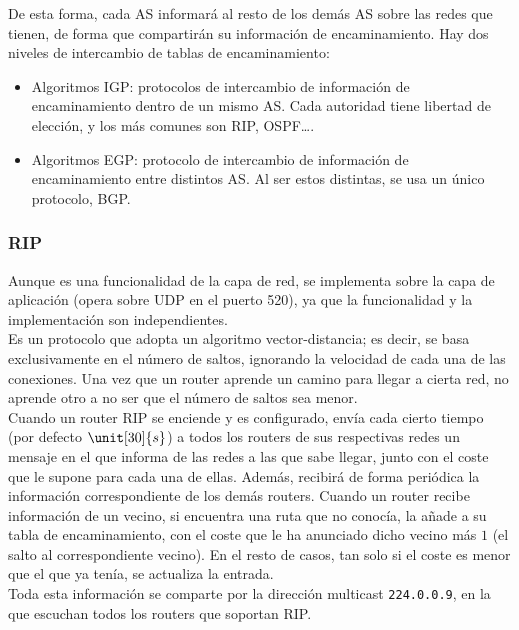 De esta forma, cada \acrshort{AS} informará al resto de los demás \acrshort{AS} sobre las redes que tienen, de forma que compartirán su información de encaminamiento. Hay dos niveles de intercambio de tablas de encaminamiento:
\begin{itemize}
    \item Algoritmos \acrfull{IGP}: protocolos de intercambio de información de encaminamiento dentro de un mismo \acrshort{AS}. Cada autoridad tiene libertad de elección, y los más comunes son \acrshort{RIP}, \acrshort{OSPF}\ldots.

    \item Algoritmos \acrfull{EGP}: protocolo de intercambio de información de encaminamiento entre distintos \acrshort{AS}. Al ser estos distintas, se usa un único protocolo, \acrshort{BGP}.
\end{itemize}

\subsubsection{\acrfull{RIP}}

Aunque es una funcionalidad de la capa de red, se implementa sobre la capa de aplicación (opera sobre \acrshort{UDP} en el puerto 520), ya que la funcionalidad y la implementación son independientes.\\

Es un protocolo que adopta un algoritmo vector-distancia; es decir, se basa exclusivamente en el número de saltos, ignorando la velocidad de cada una de las conexiones. Una vez que un router aprende un camino para llegar a cierta red, no aprende otro a no ser que el número de saltos sea menor.\\

Cuando un router \acrshort{RIP} se enciende y es configurado, envía cada cierto tiempo (por defecto $\unit[30]{s}$) a todos los routers de sus respectivas redes un mensaje en el que informa de las redes a las que sabe llegar, junto con el coste que le supone para cada una de ellas. Además, recibirá de forma periódica la información correspondiente de los demás routers. Cuando un router recibe información de un vecino, si encuentra una ruta que no conocía, la añade a su tabla de encaminamiento, con el coste que le ha anunciado dicho vecino más $1$ (el salto al correspondiente vecino). En el resto de casos, tan solo si el coste es menor que el que ya tenía, se actualiza la entrada.\\

Toda esta información se comparte por la dirección multicast \verb|224.0.0.9|, en la que escuchan todos los routers que soportan \acrshort{RIP}.\\


